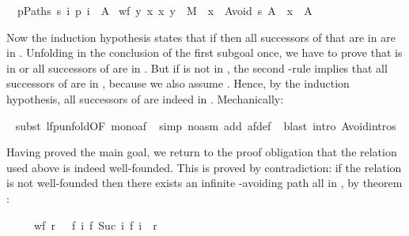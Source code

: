 \begin{isabellebody}
\begin{isamarkuptxt}
\begin{isabelle}
\ {}{\isachardot}\ {\isasymforall}p{\isasymin}Paths\ s{\isachardot}\ {\isasymexists}i{\isachardot}\ p\ i\ {\isasymin}\ A\ {\isasymLongrightarrow}\isanewline
{}wf\ {\isacharbraceleft}{\isacharparenleft}y{\isacharcomma}\ x{\isacharparenright}{\isachardot}\ {\isacharparenleft}x{\isacharcomma}\ y{\isacharparenright}\ {\isasymin}\ M\ {\isasymand}\ x\ {\isasymin}\ Avoid\ s\ A\ {\isasymand}\ x\ {\isasymnotin}\ A{\isacharbraceright}%
\end{isabelle}
Now the induction hypothesis states that if 
then all successors of  that are in  are in
. Unfolding  in the conclusion of the first
subgoal once, we have to prove that  is in  or all successors
of  are in .  But if  is not in ,
the second 
-rule implies that all successors of  are in
, because we also assume .
Hence, by the induction hypothesis, all successors of  are indeed in
. Mechanically:%
\end{isamarkuptxt}%
\ \isamarkupfalse%
subst\ lfp{\isacharunderscore}unfold{\isacharbrackleft}OF\ mono{\isacharunderscore}af{\isacharbrackright}{\isacharparenright}\isanewline
\ \isamarkupfalse%
simp\ {\isacharparenleft}no{\isacharunderscore}asm{\isacharparenright}\ add{\isacharcolon}\ af{\isacharunderscore}def{\isacharparenright}\isanewline
\ \isamarkupfalse%
blast\ intro{\isacharcolon}\ Avoid{\isachardot}intros{\isacharparenright}\isamarkuptrue%
%
\begin{isamarkuptxt}%
Having proved the main goal, we return to the proof obligation that the 
relation used above is indeed well-founded. This is proved by contradiction: if
the relation is not well-founded then there exists an infinite -avoiding path all in , by theorem
:
\begin{isabelle}%
\ \ \ \ \ wf\ r\ {\isacharequal}\ {\isacharparenleft}{\isasymnot}\ {\isacharparenleft}{\isasymexists}f{\isachardot}\ {\isasymforall}i{\isachardot}\ {\isacharparenleft}f\ {\isacharparenleft}Suc\ i{\isacharparenright}{\isacharcomma}\ f\ i{\isacharparenright}\ {\isasymin}\ r{\isacharparenright}{\isacharparenright}%

\end{isabelle}
\end{isamarkuptxt}
\end{isabellebody}
